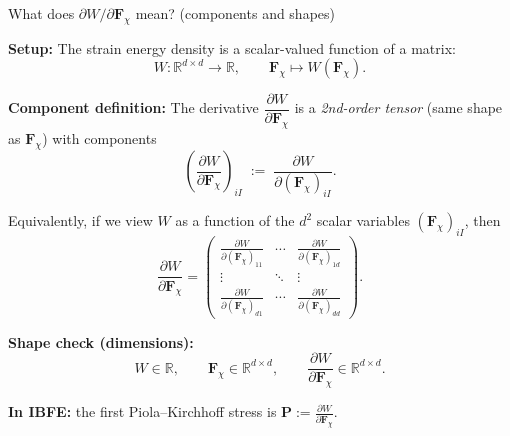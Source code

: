 \documentclass[aspectratio=169]{beamer}
\newcommand{\R}{\mathbb{R}}
\begin{document}
\begin{frame}{What does $\partial W/\partial \bm{F}_{\chi}$ mean? (components and shapes)}
\footnotesize

\textbf{Setup:} The strain energy density is a scalar-valued function of a matrix:
\[
W:\R^{d\times d}\to \R,\qquad \bm{F}_{\chi}\mapsto W(\bm{F}_{\chi}).
\]

\medskip
\textbf{Component definition:} The derivative \(\dfrac{\partial W}{\partial \bm{F}_{\chi}}\) is a \emph{2nd-order tensor}
(same shape as \(\bm{F}_{\chi}\)) with components
\[
\left(\frac{\partial W}{\partial \bm{F}_{\chi}}\right)_{iI}
\;:=\;
\frac{\partial W}{\partial (\bm{F}_{\chi})_{iI}}.
\]

\medskip
Equivalently, if we view \(W\) as a function of the \(d^2\) scalar variables \((\bm{F}_{\chi})_{iI}\), then
\[
\frac{\partial W}{\partial \bm{F}_{\chi}}
=
\begin{pmatrix}
\frac{\partial W}{\partial (\bm{F}_{\chi})_{11}} & \cdots & \frac{\partial W}{\partial (\bm{F}_{\chi})_{1d}}\\
\vdots & \ddots & \vdots\\
\frac{\partial W}{\partial (\bm{F}_{\chi})_{d1}} & \cdots & \frac{\partial W}{\partial (\bm{F}_{\chi})_{dd}}
\end{pmatrix}.
\]

\medskip
\textbf{Shape check (dimensions):}
\[
W\in\R,\qquad \bm{F}_{\chi}\in\R^{d\times d},\qquad
\frac{\partial W}{\partial \bm{F}_{\chi}}\in\R^{d\times d}.
\]

\medskip
\textbf{In IBFE:} the first Piola--Kirchhoff stress is $\bm{P} := \frac{\partial W}{\partial \bm{F}_{\chi}}.$
\end{frame}
\end{document}
